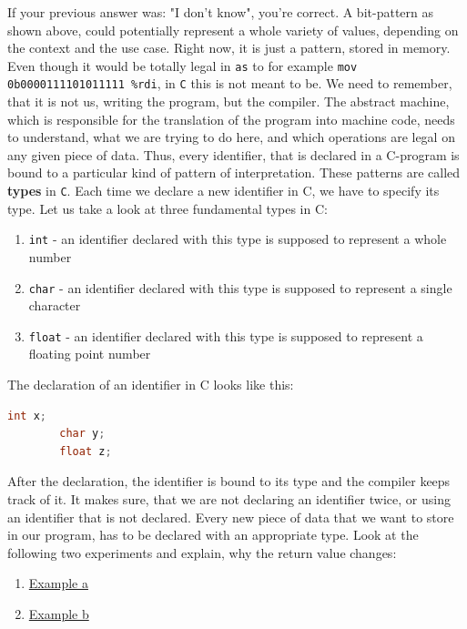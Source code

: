 \documentclass{dcbl/challenge}
\begin{document}
\begin{aufgabe}
    If your previous answer was: "I don't know", you're correct. 
    A bit-pattern as shown above, could potentially represent a whole variety of values, depending on the context and the use case.
    Right now, it is just a pattern, stored in memory.
    Even though it would be totally legal in \texttt{as} to for example \texttt{mov 0b0000111101011111 \%rdi}, in \texttt{C} this is not meant to be.
    We need to remember, that it is not us, writing the program, but the compiler.
    The abstract machine, which is responsible for the translation of the program into machine code, needs to understand, what we are trying to do here, and which operations are legal on any given piece of data.
    Thus, every identifier, that is declared in a C-program is bound to a particular kind of pattern of interpretation.
    These patterns are called \textbf{types} in \texttt{C}.
    Each time we declare a new identifier in C, we have to specify its type.
    Let us take a look at three fundamental types in C:
    \begin{enumerate}
        \item \texttt{int} - an identifier declared with this type is supposed to represent a whole number
        \item \texttt{char} - an identifier declared with this type is supposed to represent a single character
        \item \texttt{float} - an identifier declared with this type is supposed to represent a floating point number
    \end{enumerate}
    The declaration of an identifier in C looks like this:
    \begin{lstlisting}[language=c]
        int x;
        char y;
        float z;
    \end{lstlisting}
    After the declaration, the identifier is bound to its type and the compiler keeps track of it.
    It makes sure, that we are not declaring an identifier twice, or using an identifier that is not declared.
    Every new piece of data that we want to store in our program, has to be declared with an appropriate type.
    Look at the following two experiments and explain, why the return value changes:
    \begin{enumerate}
        \item \href{https://godbolt.org/z/nxK5z9fKf}{Example a}
        \item \href{https://godbolt.org/z/PG7GTPP4o}{Example b}
    \end{enumerate}
\end{aufgabe}
\end{document}
